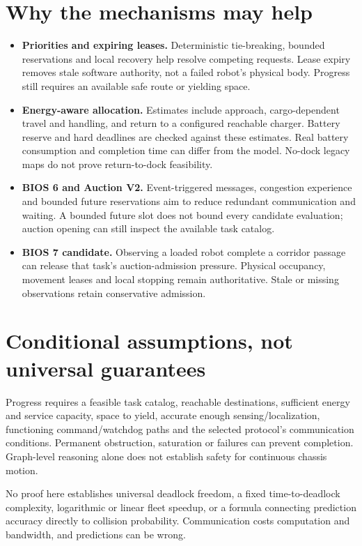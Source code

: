 \documentclass[12pt]{article}
\begin{document}
\section{Why the mechanisms may help}
\begin{itemize}
\item \textbf{Priorities and expiring leases.} Deterministic tie-breaking, bounded
reservations and local recovery help resolve competing requests. Lease expiry
removes stale software authority, not a failed robot's physical body. Progress
still requires an available safe route or yielding space.
\item \textbf{Energy-aware allocation.} Estimates include approach, cargo-dependent
travel and handling, and return to a configured reachable charger. Battery reserve
and hard deadlines are checked against these estimates. Real battery consumption
and completion time can differ from the model. No-dock legacy maps do not prove
return-to-dock feasibility.
\item \textbf{BIOS 6 and Auction V2.} Event-triggered messages, congestion experience
and bounded future reservations aim to reduce redundant communication and waiting.
A bounded future slot does not bound every candidate evaluation; auction opening
can still inspect the available task catalog.
\item \textbf{BIOS 7 candidate.} Observing a loaded robot complete a corridor
passage can release that task's auction-admission pressure. Physical occupancy,
movement leases and local stopping remain authoritative. Stale or missing
observations retain conservative admission.
\end{itemize}

\section{Conditional assumptions, not universal guarantees}
Progress requires a feasible task catalog, reachable destinations, sufficient
energy and service capacity, space to yield, accurate enough sensing/localization,
functioning command/watchdog paths and the selected protocol's communication
conditions. Permanent obstruction, saturation or failures can prevent completion.
Graph-level reasoning alone does not establish safety for continuous chassis motion.

No proof here establishes universal deadlock freedom, a fixed time-to-deadlock
complexity, logarithmic or linear fleet speedup, or a formula connecting prediction
accuracy directly to collision probability. Communication costs computation and
bandwidth, and predictions can be wrong.
\end{document}
